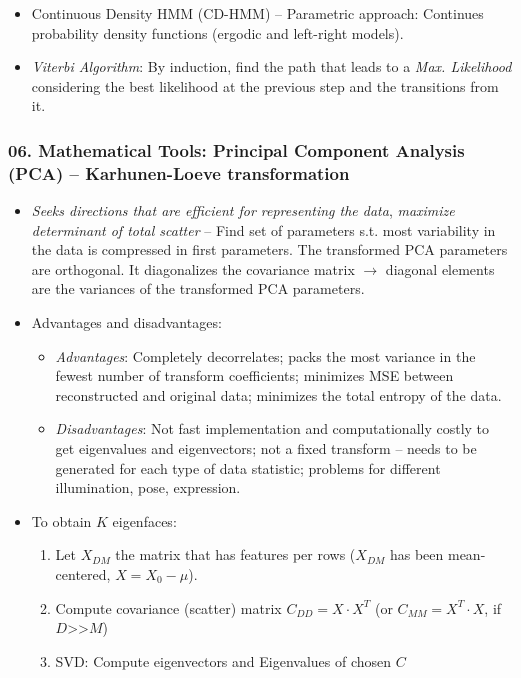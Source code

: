 \documentclass[a4paper]{article}
\begin{document}
\begin{itemize}
        \item Continuous Density HMM (CD-HMM) -- Parametric approach: Continues probability density functions (ergodic and left-right models).

        \item \emph{Viterbi Algorithm}: By induction, find the path that leads to a \emph{Max. Likelihood} considering the best likelihood at the previous step and the transitions from it.
      \end{itemize}
    \subsubsection*{06. Mathematical Tools: Principal Component Analysis (PCA) -- Karhunen-Loeve transformation}
      \begin{itemize}
        \item \emph{Seeks directions that are efficient for representing the data}, \emph{maximize determinant of total scatter} -- Find set of parameters s.t. most variability in the data is compressed in first parameters. The transformed PCA parameters are orthogonal. It diagonalizes the covariance matrix $\rightarrow$ diagonal elements are the variances of the transformed PCA parameters.
        \item Advantages and disadvantages:
        \begin{itemize}
          \item \emph{Advantages}: Completely decorrelates; packs the most variance in the fewest number of transform coefficients; minimizes MSE between reconstructed and original data; minimizes the total entropy of the data.
          \item \emph{Disadvantages}: Not fast implementation and computationally costly to get eigenvalues and eigenvectors; not a fixed transform -- needs to be generated for each type of data statistic; problems for different illumination, pose, expression.
        \end{itemize}
        \item To obtain $K$ eigenfaces:
        \begin{enumerate}
          \item Let $X_{DM}$ the matrix that has features per rows ($X_{DM}$ has been mean-centered, $X=X_0-\mu$).
          \item Compute covariance (scatter) matrix $C_{DD}=X\cdot X^T$ (or $C_{MM}=X^T\cdot X$, if $D$>>$M$)
          \item SVD: Compute eigenvectors and Eigenvalues of chosen $C$

\end{enumerate}
\end{itemize}
\end{document}
